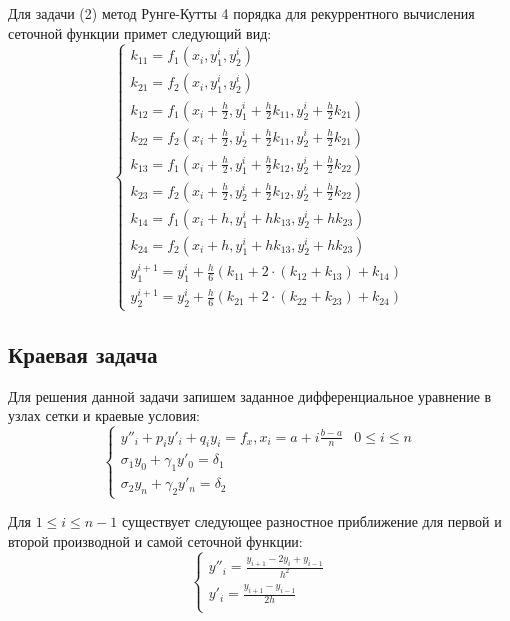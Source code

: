 \documentclass[a4paper,12pt,titlepage,finall]{article}
\begin{document}
Для задачи (2) метод Рунге-Кутты 4 порядка для рекуррентного вычисления сеточной функции примет следующий вид:
\begin{equation*}
\begin{cases}
k_{11} = f_{1}(x_{i}, y^{i}_{1}, y^{i}_{2})\\
k_{21} = f_{2}(x_{i}, y^{i}_{1}, y^{i}_{2})\\
k_{12} = f_{1}(x_{i} + \frac{h}{2}, y^{i}_{1} + \frac{h}{2}k_{11}, y^{i}_{2} + \frac{h}{2}k_{21})\\
k_{22} = f_{2}(x_{i} + \frac{h}{2}, y^{i}_{2} + \frac{h}{2}k_{11}, y^{i}_{2} + \frac{h}{2}k_{21})\\
k_{13} = f_{1}(x_{i} + \frac{h}{2}, y^{i}_{1} + \frac{h}{2}k_{12}, y^{i}_{2} + \frac{h}{2}k_{22})\\
k_{23} = f_{2}(x_{i} + \frac{h}{2}, y^{i}_{2} + \frac{h}{2}k_{12}, y^{i}_{2} + \frac{h}{2}k_{22})\\
k_{14} = f_{1}(x_{i} + h, y^{i}_{1} + hk_{13}, y^{i}_{2} + hk_{23})\\
k_{24} = f_{2}(x_{i} + h, y^{i}_{1} + hk_{13}, y^{i}_{2} + hk_{23})\\
y^{i + 1}_{1} = y^{i}_{1} + \frac{h}{6}(k_{11} + 2 \cdot (k_{12} + k_{13}) + k_{14})\\
y^{i + 1}_{2} = y^{i}_{2} + \frac{h}{6}(k_{21} + 2 \cdot (k_{22} + k_{23}) + k_{24})
\end{cases}
\end{equation*}

\subsection{Краевая задача}
Для решения данной задачи запишем заданное дифференциальное уравнение в узлах сетки и краевые условия:\\
\begin{equation*}
\begin{cases}
y''_{i}+p_{i}y'_{i}+q_{i}y_{i}=f_{x}, x_{i} = a + i\frac{b-a}{n} & 0 \leq i \leq n\\
\sigma_{1}y_{0} + \gamma_{1}y'_{0} = \delta_{1}\\
\sigma_{2}y_{n} + \gamma_{2}y'_{n} = \delta_{2}
\end{cases}
\end{equation*}

Для $ 1 \leq i \leq n-1 $ существует следующее разностное приближение для первой и второй производной и самой сеточной функции:\\
\begin{equation*}
\begin{cases}
y''_{i}=\frac{y_{i+1}-2y_{i}+y_{i-1}}{h^{2}}\\
y'_{i}=\frac{y_{i+1}-y_{i-1}}{2h}\\
\end{cases}
\end{equation*}
\end{document}
